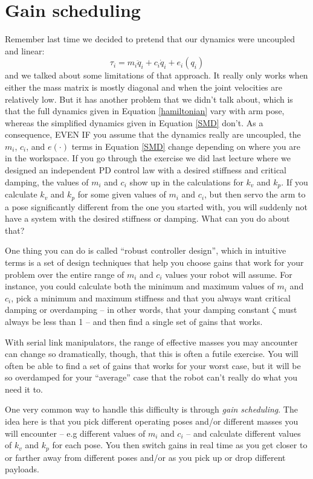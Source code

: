 \documentclass[]{article}
\begin{document}
\section{Gain scheduling}
Remember last time we decided to pretend that our dynamics were uncoupled and linear:
\begin{equation}
 \tau_{i} = m_{i}\ddot{q}_{i} + c_{i}\dot{q}_{i}+e_{i}(q_{i}) \label{SMD}
\end{equation}
and we talked about some limitations of that approach. It really only works when either the mass matrix is mostly diagonal and when the joint velocities are relatively low. But it has another problem that we didn't talk about, which is that the full dynamics given in Equation \ref{hamiltonian} vary with arm pose, whereas the simplified dynamics given in Equation \ref{SMD} don't. As a consequence, EVEN IF you assume that the dynamics really are uncoupled, the $m_{i}$, $c_{i}$, and $e(\cdot)$ terms in Equation \ref{SMD} change depending on where you are in the workspace. If you go through the exercise we did last lecture where we designed an independent PD control law with a desired stiffness and critical damping, the values of $m_{i}$ and $c_{i}$ show up in the calculations for $k_{v}$ and $k_{p}$. If you calculate $k_{v}$ and $k_{p}$ for some given values of $m_{i}$ and $c_{i}$, but then servo the arm to a pose significantly different from the one you started with, you will suddenly not have a system with the desired stiffness or damping. What can you do about that?

One thing you can do is called ``robust controller design'', which in intuitive terms is a set of design techniques that help you choose gains that work for your problem over the entire range of $m_{i}$ and $c_{i}$ values your robot will assume. For instance, you could calculate both the minimum and maximum values of $m_{i}$ and $c_{i}$, pick a minimum and maximum stiffness and that you always want critical damping or overdamping -- in other words, that your damping constant $\zeta$ must always be less than 1 -- and then find a single set of gains that works.

With serial link manipulators, the range of effective masses you may ancounter can change so dramatically, though, that this is often a futile exercise. You will often be able to find a set of gains that works for your worst case, but it will be so overdamped for your ``average'' case that the robot can't really do what you need it to.

One very common way to handle this difficulty is through \textit{gain scheduling}. The idea here is that you pick different operating poses and/or different masses you will encounter -- e.g different values of $m_{i}$ and $c_{i}$ -- and calculate different values of $k_{v}$ and $k_{p}$ for each pose. You then switch gains in real time as you get closer to or farther away from different poses and/or as you pick up or drop different payloads.
\end{document}
